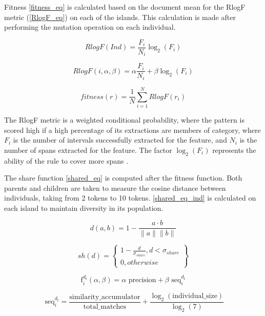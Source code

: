Fitness \ref{fitness_eq} is calculated based on the document mean for the RlogF metric (\ref*{RlogF_eq})\cite{seman_lex} on each of the islands. This calculation is made after performing the mutation operation on each individual.


\begin{equation}
  \label{RlogF_eq}
  RlogF(Ind) = \frac{F_i}{N_i} {\log_2}({F_i})
\end{equation}

\begin{equation}
  \label{RlogF_eq2}
  RlogF(i,\alpha,\beta) = \alpha\frac{F_i}{N_i} + \beta{\log_2}({F_i})
\end{equation}

\begin{equation}
  \label{fitness_eq}
  fitness(r) = \frac{1}{N} \sum_{i=1}^{N} RlogF(r_i)
\end{equation}

The RlogF metric is a weighted conditional probability, where the pattern is scored high if a high percentage of its extractions are members of category\cite{seman_lex}, where ${F_i}$ is the number of intervals successfully extracted for the feature,
and ${ N_i}$ is the number of spans extracted for the feature. The factor ${\log_2}({F_i})$ represents the ability of the rule to cover more spans \cite{tallor}.

The share function \ref{shared_eq} is computed after the fitness function. Both parents and children are taken to measure the cosine distance between individuals, taking from 2 tokens to 10 tokens. \ref{shared_eq_ind} is calculated on each island to maintain diversity in its population.

\begin{equation}
  \label{cosine_distance}
  d(a, b) = 1- \frac{a \cdot b}{\|a\| \|b\|}
\end{equation}


\begin{equation}
  \label{shared_eq}
  sh(d) = \left \{
  \begin{array}{l}
    1  - \frac{d}{\sigma_{share}}, d < {\sigma_{share}} \\
    0, otherwise
  \end{array}
  \right \}
\end{equation}

$$
  \text{f}^{d_{t}}_{i}(\alpha,\beta) =
  \alpha \text{ precision} + \beta \text{ seq}^{d_{t}}_{i}
$$

$$
  \text{ seq}^{d_{t}}_{i} = \frac{\text{similarity\_accumulator}}{\text{total\_matches}} + \frac{\log_2(\text{individual\_size})}{\log_2(7)}
$$


